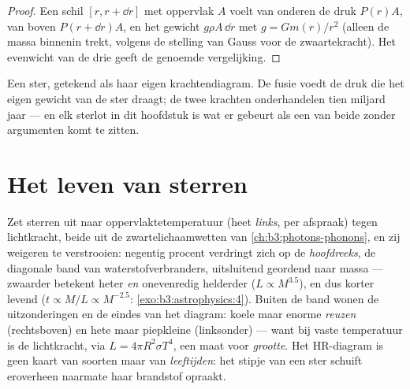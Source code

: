 \begin{proof}
Een schil $[r, r + \dd r]$ met oppervlak $A$ voelt van onderen de druk $P(r)A$,
van boven $P(r + \dd r)A$, en het gewicht $g\rho A\,\dd r$
met $g = Gm(r)/r^2$ (alleen de massa binnenin trekt, volgens de
stelling van Gauss voor de zwaartekracht). Het evenwicht van de drie geeft de genoemde
vergelijking.
\end{proof}

\begin{omfigure}

{\small Een ster, getekend als haar eigen krachtendiagram. De fusie voedt
de druk die het eigen gewicht van de ster draagt; de twee krachten
onderhandelen tien miljard jaar --- en elk sterlot in dit
hoofdstuk is wat er gebeurt als een van beide zonder argumenten komt te zitten.}
\end{omfigure}

\section{Het leven van sterren}

\begin{definition}\label{def:b3:astrophysics:hr}
Zet sterren uit naar oppervlaktetemperatuur (heet \emph{links}, per
afspraak) tegen lichtkracht, beide uit de zwartelichaamwetten van
\cref{ch:b3:photons-phonons}, en zij weigeren te
verstrooien: negentig procent verdringt zich op de \emph{hoofdreeks}, de
diagonale band van waterstofverbranders, uitsluitend geordend naar massa ---
zwaarder betekent heter \emph{en} onevenredig helderder
($L \propto M^{3.5}$), en dus korter levend
($t \propto M/L \propto M^{-2.5}$:
\cref{exo:b3:astrophysics:4}). Buiten de band wonen de
uitzonderingen en de eindes van het diagram: koele maar enorme \emph{reuzen}
(rechtsboven) en hete maar piepkleine \emph{} (linksonder)
--- want bij vaste temperatuur is de lichtkracht, via $L = 4\pi R^2\sigma T^4$,
een maat voor \emph{grootte}. Het HR-diagram is geen
kaart van soorten maar van \emph{leeftijden}: het stipje van een ster schuift eroverheen naarmate
haar brandstof opraakt.
\end{definition}

